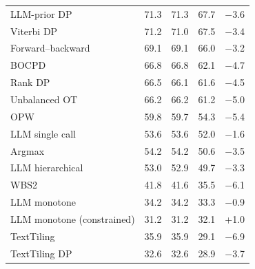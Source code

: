 \begin{table}[t]
\begin{tabular*}{\linewidth}{@{\extracolsep{\fill}}lrrrr@{}}
LLM-prior DP & 71.3 & 71.3 & 67.7 & $-$3.6 \\
Viterbi DP & 71.2 & 71.0 & 67.5 & $-$3.4 \\
Forward--backward & 69.1 & 69.1 & 66.0 & $-$3.2 \\
BOCPD & 66.8 & 66.8 & 62.1 & $-$4.7 \\
Rank DP & 66.5 & 66.1 & 61.6 & $-$4.5 \\
Unbalanced OT & 66.2 & 66.2 & 61.2 & $-$5.0 \\
OPW & 59.8 & 59.7 & 54.3 & $-$5.4 \\
LLM single call & 53.6 & 53.6 & 52.0 & $-$1.6 \\
Argmax & 54.2 & 54.2 & 50.6 & $-$3.5 \\
LLM hierarchical & 53.0 & 52.9 & 49.7 & $-$3.3 \\
WBS2 & 41.8 & 41.6 & 35.5 & $-$6.1 \\
LLM monotone & 34.2 & 34.2 & 33.3 & $-$0.9 \\
LLM monotone (constrained) & 31.2 & 31.2 & 32.1 & +1.0 \\
TextTiling & 35.9 & 35.9 & 29.1 & $-$6.9 \\
TextTiling DP & 32.6 & 32.6 & 28.9 & $-$3.7 \\
\bottomrule
\end{tabular*}
\end{table}
